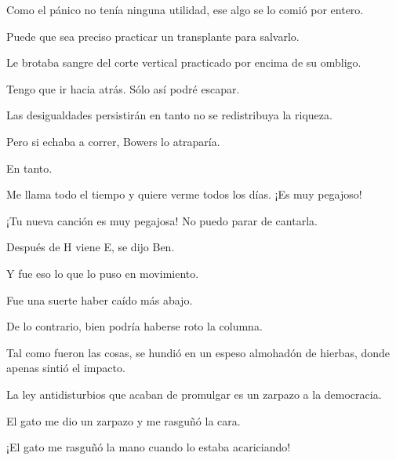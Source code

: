 \sk
Como el pánico no tenía ninguna
utilidad, ese algo se lo comió por entero.

\sk
Puede que sea preciso practicar un transplante para salvarlo.

\sk
Le brotaba
sangre del corte vertical practicado por encima de
su ombligo.

\sk
Tengo que ir hacia atrás. Sólo así podré escapar.

\sk
Las desigualdades persistirán en tanto no se redistribuya la riqueza.

\sk
Pero si echaba a correr, Bowers lo atraparía.

\sk
En tanto. 

\sk
Me llama todo el tiempo y quiere verme todos los días. ¡Es muy pegajoso!

\sk
¡Tu nueva canción es muy pegajosa! No puedo parar de cantarla.

\sk
Después de H viene E, se dijo Ben.

\sk
Y fue eso lo que lo puso en movimiento.

\sk
Fue una suerte haber caído más abajo.

\sk
De lo contrario, bien podría haberse roto la columna.

\sk
Tal como fueron las cosas, se
hundió en un espeso almohadón de hierbas,
donde apenas sintió el impacto.

\sk
La ley antidisturbios que acaban de promulgar es un zarpazo a la democracia.

\sk
El gato me dio un zarpazo y me rasguñó la cara.

\sk
¡El gato me rasguñó la mano cuando lo estaba acariciando!

